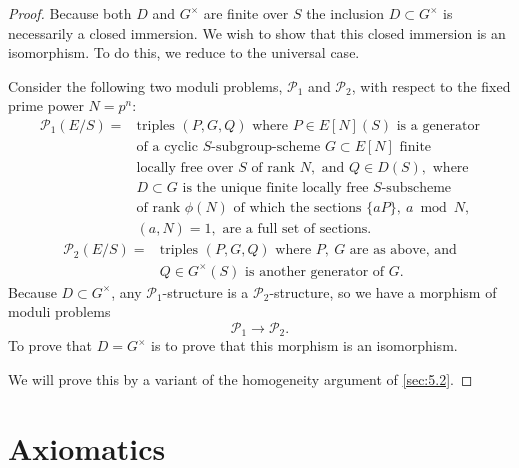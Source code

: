 \begin{proof}
Because both $D$ and $G^\times$ are finite over $S$ the inclusion $D \subset G^\times$ is necessarily a closed immersion. We wish to show that this closed immersion is an isomorphism. To do this, we reduce to the universal case.

Consider the following two moduli problems, $\mathcal{P}_1$ and $\mathcal{P}_2$, with respect to the fixed prime power $N = p^n$:
\[
\begin{aligned}
\mathcal{P}_1(E/S) = {} & \text{triples } (P, G, Q) \text{ where } P \in E[N](S) \text{ is a generator} \\
& \text{of a cyclic } S\text{-subgroup-scheme } G \subset E[N] \text{ finite} \\
& \text{locally free over } S \text{ of rank } N, \text{ and } Q \in D(S), \text{ where} \\
& D \subset G \text{ is the unique finite locally free } S\text{-subscheme} \\
& \text{of rank } \phi(N) \text{ of which the sections } \{aP\},\ a \bmod N, \\
& (a,N) = 1, \text{ are a full set of sections.}
\end{aligned}
\]
\[
\begin{aligned}
\mathcal{P}_2(E/S) = {} & \text{triples } (P, G, Q) \text{ where } P,\ G \text{ are as above, and} \\
& Q \in G^\times(S) \text{ is another generator of } G.
\end{aligned}
\]
Because $D \subset G^\times$, any $\mathcal{P}_1$-structure is a $\mathcal{P}_2$-structure, so we have a morphism of moduli problems
\[
\mathcal{P}_1 \to \mathcal{P}_2.
\]
To prove that $D = G^\times$ is to prove that this morphism is an isomorphism.

We will prove this by a variant of the homogeneity argument of \ref{sec:5.2}.
\end{proof}

\section{Axiomatics}
\label{sec:6.2}

